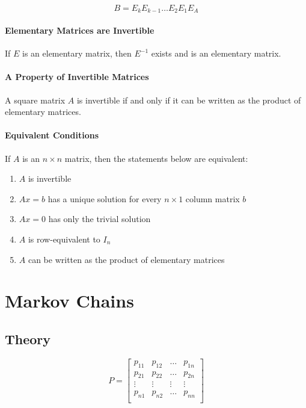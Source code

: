 \documentclass{report}
\begin{document}
$$
B = E_k E_{k-1} \hdots E_2 E_1 E_A
$$

\paragraph{Elementary Matrices are Invertible} If $E$ is an elementary matrix, then $E^{-1}$ exists and is an elementary matrix.

\paragraph{A Property of Invertible Matrices} A square matrix $A$ is invertible if and only if it can be written as the product of elementary matrices.

\paragraph{Equivalent Conditions} If $A$ is an $n \times n$ matrix, then the statements below are equivalent:

\begin{enumerate}
    \item $A$ is invertible
    \item $Ax=b$ has a unique solution for every $n \times 1$ column matrix $b$
    \item $Ax = 0$ has only the trivial solution
    \item $A$ is row-equivalent to $I_n$
    \item $A$ can be written as the product of elementary matrices
\end{enumerate}

\section{Markov Chains}
\subsection{Theory}

\[ 
P
=
\begin{bmatrix}
    p_{11} & p_{12} & \hdots & p_{1n}\\
    p_{21} & p_{22} & \hdots & p_{2n} \\
    \vdots & \vdots & \vdots & \vdots \\
    p_{n1} & p_{n2} & \hdots & p_{nn} \\
\end{bmatrix}
\]\\
\end{document}
